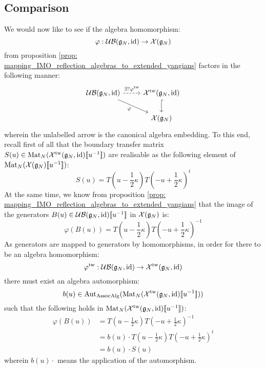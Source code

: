         \subsection{Comparison}
            We would now like to see if the algebra homomorphism:
                $$\varphi: \mathcal{UB}(\mathfrak{g}_N, \mathrm{id}) \to \mathcal{X}(\mathfrak{g}_N)$$
            from proposition \ref{prop: mapping_IMO_reflection_algebras_to_extended_yangians} factors in the following manner:
                \begin{equation} \label{equation: mapping_IMO_reflection_algebras_to_extended_untwisted_yangians_via_extended_twisted_yangians}
                    \begin{tikzcd}
                	{\UB(\g_N, \id)} & {\calX^{\tw}(\g_N, \id)} \\
                	& {\calX(\g_N)}
                	\arrow["{\exists ? \varphi^{\tw}}", dashed, from=1-1, to=1-2]
                	\arrow["\varphi"', from=1-1, to=2-2]
                	\arrow[hook, from=1-2, to=2-2]
                    \end{tikzcd}
                \end{equation}
            wherein the unlabelled arrow is the canonical algebra embedding. To this end, recall first of all that the boundary transfer matrix $S(u) \in \mathrm{Mat}_N(\mathcal{X}^{\mathrm{tw}}(\mathfrak{g}_N, \mathrm{id})[\![u^{-1}]\!])$ are realisable as the following element of $\mathrm{Mat}_N(\mathcal{X}(\mathfrak{g}_N)[\![u^{-1}]\!])$:
                $$S(u) = T\left(u - \frac12 \kappa\right) T\left(-u + \frac12 \kappa\right)^t$$
            At the same time, we know from proposition \ref{prop: mapping_IMO_reflection_algebras_to_extended_yangians} that the image of the generators $B(u) \in \mathcal{UB}(\mathfrak{g}_N, \mathrm{id})[\![u^{-1}]\!]$ in $\mathcal{X}(\mathfrak{g}_N)$ is:
                $$\varphi( B(u) ) = T\left(u - \frac12 \kappa\right) T\left(-u + \frac12 \kappa\right)^{-1}$$
            As generators are mapped to generators by homomorphisms, in order for there to be an algebra homomorphism:
                $$\varphi^{\mathrm{tw}}: \mathcal{UB}(\mathfrak{g}_N, \mathrm{id}) \to \mathcal{X}^{\mathrm{tw}}(\mathfrak{g}_N, \mathrm{id})$$
            there must exist an algebra automorphism:
                $$b(u) \in \mathrm{Aut}_{\mathrm{Assoc}\mathrm{Alg}}( \mathrm{Mat}_N(\mathcal{X}^{\mathrm{tw}}(\mathfrak{g}_N, \mathrm{id})[\![u^{-1}]\!]) )$$
            such that the following holds in $\mathrm{Mat}_N(\mathcal{X}^{\mathrm{tw}}(\mathfrak{g}_N, \mathrm{id})[\![u^{-1}]\!])$:
                $$
                    \begin{aligned}
                        \varphi(B(u)) & = T\left(u - \frac12 \kappa\right) T\left(-u + \frac12 \kappa\right)^{-1}
                        \\
                        & = b(u) \cdot T\left(u - \frac12 \kappa\right) T\left(-u + \frac12 \kappa\right)^t
                        \\
                        & = b(u) \cdot S(u)
                    \end{aligned}
                $$
            wherein $b(u) \cdot$ means the application of the automorphism.
            
